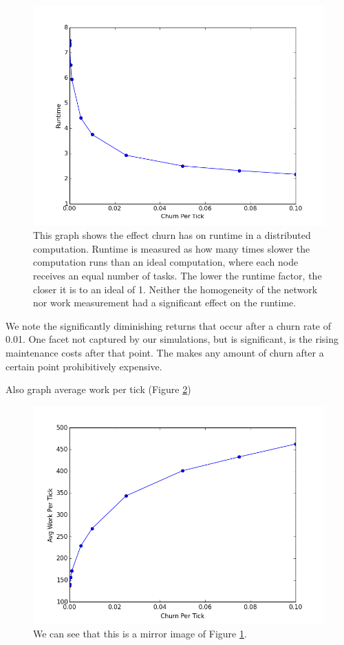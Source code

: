 \begin{figure}
	\centering
	\includegraphics[width=0.7\linewidth]{figs/churnVsTime}
	\caption[Churn vs Runtime factor]{This graph shows the effect churn has on runtime in a distributed computation.
		Runtime is measured as how many times slower the computation runs than an ideal computation, where each node receives an equal number of tasks.
		The lower the runtime factor, the closer it is to an ideal of 1.
		Neither the homogeneity of the network nor work measurement had a significant effect on the runtime.}
	\label{fig:churnVsTime}
\end{figure}


We note the significantly diminishing returns that occur after a churn rate of 0.01.
One facet not captured by our simulations, but is significant, is the rising maintenance costs after that point.
The makes any amount of churn after a certain point prohibitively expensive.

Also graph average work per tick (Figure \ref{fig:churnVsWork})
\begin{figure}
\centering
\includegraphics[width=0.7\linewidth]{figs/churnVsWork}
\caption[Churn vs average work per tick]{We can see that this is a mirror image of Figure \ref{fig:churnVsTime}.}
\label{fig:churnVsWork}
\end{figure}


